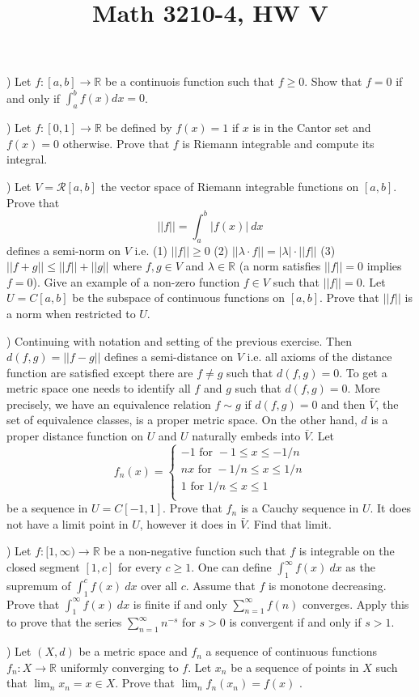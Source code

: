 \documentclass[11pt]{amsart}
\theoremstyle{plain}
\numberwithin{equation}{section}
\begin{document}
\title{ Math 3210-4,  HW V}
\maketitle
\vskip 10pt 
)  Let $f: [a,b] \rightarrow \mathbb R$ be a continuois function such that $f\geq 0$. Show that $f=0$ if and only if $\int_a^b f(x) dx=0$. 



\vskip 10pt 
)  Let $f:[0,1]\rightarrow \mathbb R$ be defined by $f(x)=1$ if $x$ is in the Cantor set and $f(x)=0$ otherwise. Prove that $f$ is Riemann integrable and compute its 
integral. 


\vskip 10pt 
) Let $V=\mathcal R[a,b]$ the vector space of Riemann integrable functions on $[a,b]$. Prove that 
\[ 
||f||=\int_a^b |f(x)| ~dx 
\] 
defines a semi-norm on $V$ i.e. (1)  $||f||\geq 0$ (2) $||\lambda \cdot f || = |\lambda |\cdot ||f||$ (3) $||f + g|| \leq ||f|| + ||g||$ where $f,g\in V$ and 
$\lambda \in \mathbb R$ (a norm satisfies $||f||=0$ implies $f=0$). Give an example of a non-zero function $f\in V$ such that $||f||=0$.  
Let $U=C[a,b]$ be the subspace of continuous functions on $[a,b]$. Prove that $||f||$ is a norm when restricted to $U$. 

\vskip 10pt 
)  Continuing with notation and setting of the previous exercise. Then $d(f,g)=||f-g||$ defines a semi-distance on $V$ i.e. all axioms of the distance function are 
satisfied except there are $f\neq g$ such that $d(f,g)=0$. To get a metric space one needs to identify all $f$ and $g$ such that $d(f,g)=0$. More precisely, 
we have an equivalence relation $f\sim  g$ if $d(f,g)=0$ and then $\bar V$, the set of equivalence classes, is a proper metric space. 
 On the other hand, $d$ is a proper distance function on $U$ and $U$ naturally embeds into $\bar V$.  Let 
\[ 
f_n(x)=
 \begin{cases} -1  \text{ for } -1\leq x \leq -1/n \\
nx  \text{ for } -1/n \leq x \leq 1/n \\ 
 1   \text{ for } 1/n\leq x \leq 1 \\
  \end{cases} 
\]
be a sequence in $U=C[-1,1]$. Prove that $f_n$ is a Cauchy sequence in $U$. It does not have a limit point in $U$, however it does in $\bar V$. Find that limit. 



\vskip 10pt 
)  Let $f: [1,\infty)\rightarrow \mathbb R$ be a non-negative function such that $f$ is integrable on the closed segment $[1,c]$ for every $c\geq 1$. One can define 
$\int_{1}^{\infty} f(x) ~dx$ as the supremum of $\int_{1}^{c} f(x) ~dx$ over all $c$. 
Assume that $f$ is monotone decreasing. Prove that $\int_{1}^{\infty} f(x) ~dx$ is finite 
if and only $\sum_{n=1}^{\infty} f(n)$ converges.  Apply this to prove that the series $\sum_{n=1}^{\infty} n^{-s}$ for $s>0$ is convergent if and only if $s>1$. 
\vskip 10pt 
\noindent 

\vskip 10pt 
) Let $(X,d)$ be a metric space and $f_n$ a sequence of continuous functions  $f_n : X \rightarrow \mathbb R$ uniformly converging to $f$. Let $x_n$ be a 
sequence of points in $X$ such that $\lim_n x_n=x\in X$. Prove that $\lim_n f_n(x_n)=f(x)$ . 
\end{document}
